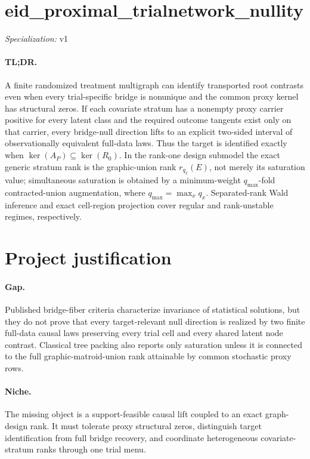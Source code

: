 \documentclass{article}
\begin{document}
\sloppy

\section*{eid\_\allowbreak{}proximal\_\allowbreak{}trialnetwork\_\allowbreak{}nullity}

\noindent\textit{Specialization:} v1\par

\paragraph{TL;DR.} A finite randomized treatment multigraph can identify transported root contrasts even when every trial-specific bridge is nonunique and the common proxy kernel has structural zeros.  If each covariate stratum has a nonempty proxy carrier positive for every latent class and the required outcome tangents exist only on that carrier, every bridge-null direction lifts to an explicit two-sided interval of observationally equivalent full-data laws.  Thus the target is identified exactly when \(\ker(A_P)\subseteq\ker(R_0)\).  In the rank-one design submodel the exact generic stratum rank is the graphic-union rank \(r_{q_x}(E)\), not merely its saturation value; simultaneous saturation is obtained by a minimum-weight \(q_{\max}\)-fold contracted-union augmentation, where \(q_{\max}=\max_xq_x\).  Separated-rank Wald inference and exact cell-region projection cover regular and rank-unstable regimes, respectively.

\section{Project justification}

\paragraph{Gap.} Published bridge-fiber criteria characterize invariance of statistical solutions, but they do not prove that every target-relevant null direction is realized by two finite full-data causal laws preserving every trial cell and every shared latent node contrast.  Classical tree packing also reports only saturation unless it is connected to the full graphic-matroid-union rank attainable by common stochastic proxy rows.

\paragraph{Niche.} The missing object is a support-feasible causal lift coupled to an exact graph-design rank.  It must tolerate proxy structural zeros, distinguish target identification from full bridge recovery, and coordinate heterogeneous covariate-stratum ranks through one trial menu.
\end{document}
